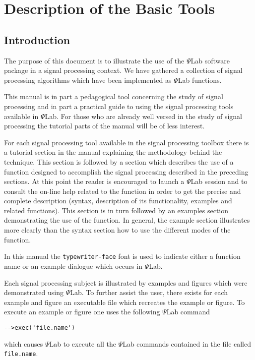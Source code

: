 \chapter{Description of the Basic Tools}

\section{Introduction}

The purpose of this document is to illustrate the use of the $\Psi$Lab software
package
in a signal processing context.
We have gathered a collection of signal processing 
algorithms which have been implemented 
as $\Psi$Lab functions. 

	This manual is in part a pedagogical tool concerning
the study of signal processing and in part a practical guide
to using the signal processing tools available in $\Psi$Lab. 
For those who are already well versed in the study of signal processing 
the tutorial parts of the manual will be of less interest. 

	For each signal processing tool available in the signal 
processing toolbox there is a tutorial section in the manual explaining the
methodology behind the technique. This  section is followed by a 
section which describes the use  of a function designed to 
accomplish the signal processing described in the preceding sections.  
At this point the reader is encouraged to launch a $\Psi$Lab session and to
consult the on-line help related to the function in order to get the precise 
and complete description (syntax, description of its functionality, examples 
and related functions). This
section is in turn followed by an examples section demonstrating the
use of the function.  In general, the example section illustrates
more clearly than the syntax section how to use the different modes
of the function.

	In this manual the {\tt typewriter-face} font is used to indicate
either a function name or an example dialogue which occurs in $\Psi$Lab.

	Each signal processing subject is illustrated by examples
and figures which were demonstrated using $\Psi$Lab.
To further assist the user, there exists for each example and figure an 
executable file which recreates the example or figure.  
To execute an example or figure one uses the following $\Psi$Lab command
\begin{verbatim}
-->exec('file.name')
\end{verbatim}
which causes $\Psi$Lab to execute all the $\Psi$Lab commands contained
in the file called {\tt file.name}.  

